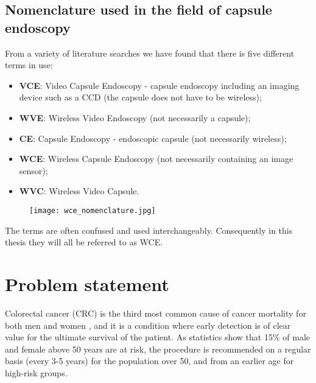 \documentclass[thesis.tex]{subfiles}
\begin{document}


\subsection{Nomenclature used in the field of capsule endoscopy}
From a variety of literature searches we have found that there is five different terms in use:

\begin{itemize}
\item \textbf{VCE}: Video Capsule Endoscopy - capsule endoscopy including an imaging device such as a CCD (the capsule does not have to be wireless);
\item \textbf{WVE}: Wireless Video Endoscopy (not necessarily a capsule);
\item \textbf{CE}: Capsule Endoscopy - endoscopic capsule (not necessarily wireless);
\item \textbf{WCE}: Wireless Capsule Endoscopy (not necessarily containing an image sensor);
\item \textbf{WVC}: Wireless Video Capsule.
\end{itemize}

\begin{figure}[H] %
  \begin{center}
    \texttt{[image: wce\_nomenclature.jpg]}
    \caption[]{}
    \label{fig:wce_nomenclature}
  \end{center}
\end{figure}

The terms are often confused and used interchangeably. Consequently in this thesis they will all be referred to as WCE.



\section{Problem statement} \label{sec:problem_statment}
Colorectal cancer (CRC) is the third most common cause of cancer mortality for both men and women \cite{CancerStatistics10}, and it is a condition where early detection is of clear value for the ultimate survival of the patient. As statistics show that 15\% of male and female above 50 years are at risk, the procedure is recommended on a regular basis (every 3-5 years) for the population over 50, and from an earlier age for high-risk groups. 
\end{document}
